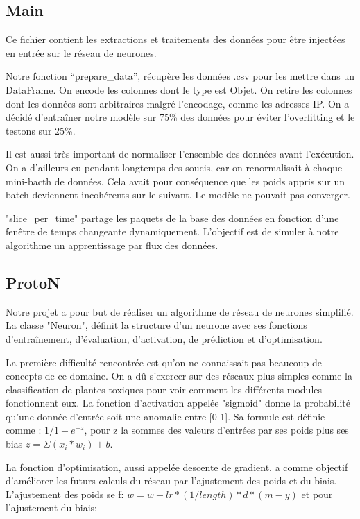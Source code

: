 \documentclass{article}
\begin{document}
\subsection{Main}
Ce fichier contient les extractions et traitements des données pour être injectées en entrée sur le réseau de neurones. 

Notre fonction “prepare\_data”, récupère les données .csv pour les mettre dans un DataFrame. On encode les colonnes dont le type est Objet. On retire les
colonnes dont les données sont arbitraires malgré l’encodage, comme les adresses IP. On a décidé d'entraîner notre modèle sur 75\% des données pour éviter 
l’overfitting et le testons sur 25\%.

Il est aussi très important de normaliser l'ensemble des données avant l'exécution. On a d’ailleurs eu pendant longtemps des soucis, car on renormalisait à
chaque mini-bacth de données. Cela avait pour conséquence que les poids appris sur un batch deviennent incohérents sur le suivant. Le modèle ne pouvait pas 
converger.

"slice\_per\_time" partage les paquets de la base des données en fonction d’une fenêtre de temps changeante dynamiquement. L’objectif est de simuler à notre
algorithme un apprentissage par flux des données.


\subsection{ProtoN}

Notre projet a pour but de réaliser  un algorithme de réseau de neurones simplifié. La classe "Neuron", définit la structure d'un neurone avec ses fonctions
d'entraînement, d'évaluation, d'activation, de prédiction et d'optimisation. 

La première difficulté rencontrée est qu’on ne connaissait pas beaucoup de concepts de ce domaine. On a dû s'exercer sur des réseaux plus simples comme la 
classification de plantes toxiques pour voir comment les différents modules fonctionnent eux.
La fonction d'activation  appelée "sigmoid" donne la probabilité qu’une donnée d'entrée soit une anomalie entre [0-1]. Sa formule est définie comme :
\( 1/1+e^{-z} \), pour z la sommes des valeurs d'entrées par ses poids plus ses bias \(z = \Sigma(x_i*w_i)+b \).

La fonction d'optimisation, aussi appelée descente de gradient, a comme objectif d'améliorer les futurs calculs du réseau par l'ajustement des poids et du 
biais. L'ajustement des poids se f: \(w=w- lr*(1/length) * d * (m-y)\) et pour l'ajustement du biais:
\end{document}
